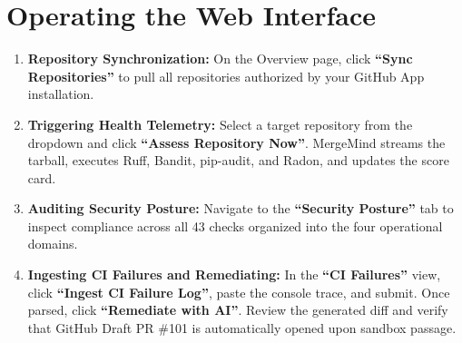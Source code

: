 \section{Operating the Web Interface}

\begin{enumerate}
    \item \textbf{Repository Synchronization:} On the Overview page, click \textbf{``Sync Repositories''} to pull all repositories authorized by your GitHub App installation.
    \item \textbf{Triggering Health Telemetry:} Select a target repository from the dropdown and click \textbf{``Assess Repository Now''}. MergeMind streams the tarball, executes Ruff, Bandit, pip-audit, and Radon, and updates the score card.
    \item \textbf{Auditing Security Posture:} Navigate to the \textbf{``Security Posture''} tab to inspect compliance across all 43 checks organized into the four operational domains.
    \item \textbf{Ingesting CI Failures and Remediating:} In the \textbf{``CI Failures''} view, click \textbf{``Ingest CI Failure Log''}, paste the console trace, and submit. Once parsed, click \textbf{``Remediate with AI''}. Review the generated diff and verify that GitHub Draft PR \#101 is automatically opened upon sandbox passage.
\end{enumerate}

